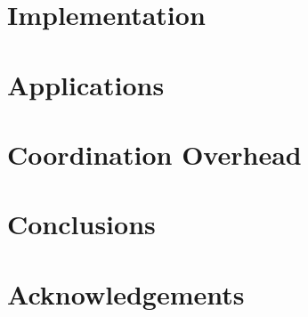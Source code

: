 \documentclass[pldi,blind,clearpagebib]{sigplanconf-pldi15}
\begin{document}
\section{Implementation}\label{sec:implementation}


\section{Applications}\label{sec:applications}


\section{Coordination Overhead}


\section{Conclusions}

\section{Acknowledgements}





\end{document}
